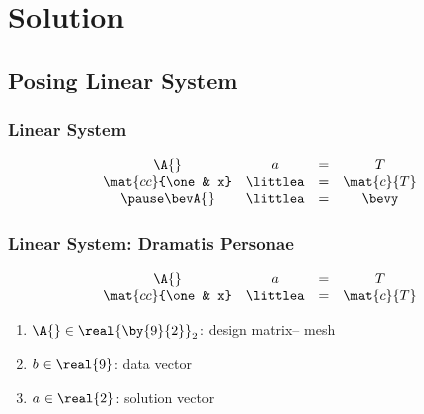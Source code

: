 % 

\section{Solution}
%
\subsection{Posing Linear System}
%
\begin{frame}\frametitle{Linear System}
\begin{equation}
	\begin{array}{ccccc cccc}
		\A{} & a & = & T \\
		\mat{cc}{\one & x} & \littlea & = & \mat{c}{T}\\
		\pause
		\bevA{} & \littlea & = & \bevy 
	\end{array}
\label{eq:bevington normal equations problem and solution}
\end{equation}
\end{frame}
%
%
\begin{frame}\frametitle{Linear System: Dramatis Personae}
\begin{equation}
	\begin{array}{cccc}
		\A{} & a & = & T \\
		\mat{cc}{\one & x} & \littlea & = & \mat{c}{T}\\
	\end{array}
\label{eq:Dramatis Personae}
\end{equation}
\begin{enumerate}
	\item $\A{}\in\real{\by{9}{2}}_{2}$: design matrix-- mesh
	\item $b\in\real{9}$: data vector
	\item $a\in\real{2}$: solution vector
\end{enumerate}
\end{frame}
